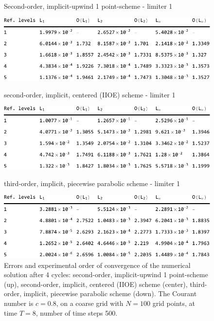 \documentclass[../thesis.tex]{subfiles}
\begin{document}
\begin{figure}[H]
	\centering
    \caption*{Second-order, implicit-upwind 1 point-scheme - limiter 1}
	\includegraphics[width=\textwidth]{../tab/tab-1point-c0p8-T8-limit1-smooth.pdf}
    \caption*{second-order, implicit, centered (IIOE) scheme - limiter 1}
	\includegraphics[width=\textwidth]{../tab/tab-iioe-c0p8-T8-limit1-smooth.pdf}
    \caption*{third-order, implicit, piecewise parabolic scheme - limiter 1}
	\includegraphics[width=\textwidth]{../tab/tab-implicit-ppm-c0p8-T8-limit1-smooth.pdf}
	\caption{Errors and experimental order of convergence of the numerical solution after 4 cycles: second-order, implicit-upwind 1 point-scheme (up), second-order, implicit, centered (IIOE) scheme (center), third-order, implicit, piecewise parabolic scheme (down). The Courant number is \(c = 0.8\), on a coarse grid with \(N = 100\) grid points, at time \(T = 8\), number of time steps 500.}
	\label{tab:c0p8-T8-limit1-smooth}
\end{figure}
\end{document}
